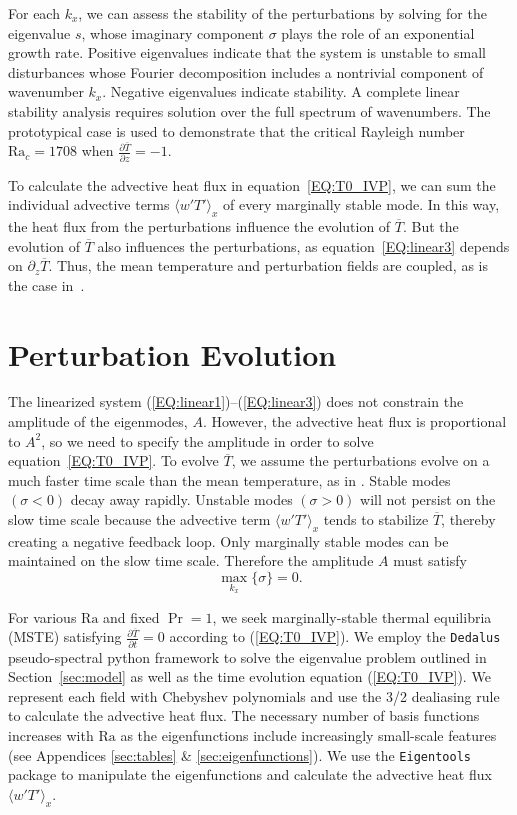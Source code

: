 \documentclass[reprint,amsmath,amssymb,aps,nofootinbib]{revtex4-1}
\newcommand\Ra{\mathrm{Ra}}
\newcommand{\eq}[1]{(\ref{#1})}
\newcommand{\eqss}[2]{(\ref{#1})--(\ref{#2})}
\begin{document}
For each $k_x$, we can assess the stability of the perturbations by solving for the eigenvalue $s$, whose imaginary component $\sigma$ plays the role of an exponential growth rate. 
Positive eigenvalues indicate that the system is unstable to small disturbances whose Fourier decomposition includes a nontrivial component of wavenumber $k_x$.
Negative eigenvalues indicate stability. 
A complete linear stability analysis requires solution over the full spectrum of wavenumbers. 
The prototypical case is used to demonstrate that the critical Rayleigh number $\Ra_c = 1708$ when $\frac{\partial \overline{T}}{\partial z} = -1$.

To calculate the advective heat flux in equation~\ref{EQ:T0_IVP}, we can sum the individual advective terms $\langle w'T' \rangle_x$ of every marginally stable mode.
In this way, the heat flux from the perturbations influence the evolution of $\overline{T}$.
But the evolution of $\overline{T}$ also influences the perturbations, as equation~\ref{EQ:linear3} depends on $\partial_z \overline{T}$.
Thus, the mean temperature and perturbation fields are coupled, as is the case in~\cite{Beaume_2015, Chini_ql}.

\section{Perturbation Evolution}\label{sec:evolution}
The linearized system \eqss{EQ:linear1}{EQ:linear3} does not constrain the amplitude of the eigenmodes, $A$.
However, the advective heat flux is proportional to $A^2$, so we need to specify the amplitude in order to solve equation~\ref{EQ:T0_IVP}.
To evolve $\overline{T}$, we assume the perturbations evolve on a much faster time scale than the mean temperature, as in \cite{michel_chini_2019}.
Stable modes $(\sigma < 0)$ decay away rapidly. 
Unstable modes $(\sigma > 0)$ will not persist on the slow time scale because the advective term $\langle w'T' \rangle_x$ tends to stabilize $\overline{T}$, thereby creating a negative feedback loop.
Only marginally stable modes can be maintained on the slow time scale.
Therefore the amplitude $A$ must satisfy
\begin{equation}
    \max_{k_x} \{ \sigma \} = 0.
\end{equation}

For various $\Ra$ and fixed $\Pr = 1$, we seek marginally-stable thermal equilibria (MSTE) satisfying $\frac{\partial \overline{T}}{\partial t} = 0$ according to \eq{EQ:T0_IVP}. 
We employ the \texttt{Dedalus} pseudo-spectral python framework\footnotemark[1] \cite{Dedalus_2020} to solve the eigenvalue problem outlined in Section~\ref{sec:model} as well as the time evolution equation \eq{EQ:T0_IVP}.
We represent each field with Chebyshev polynomials and use the 3/2 dealiasing rule to calculate the advective heat flux.
The necessary number of basis functions increases with $\Ra$ as the eigenfunctions include increasingly small-scale features (see Appendices \ref{sec:tables} \& \ref{sec:eigenfunctions}). 
We use the \texttt{Eigentools} package\footnotemark[2] \cite{Eigentools} to manipulate the eigenfunctions and calculate the advective heat flux $\langle w' T' \rangle_x$.
\end{document}
